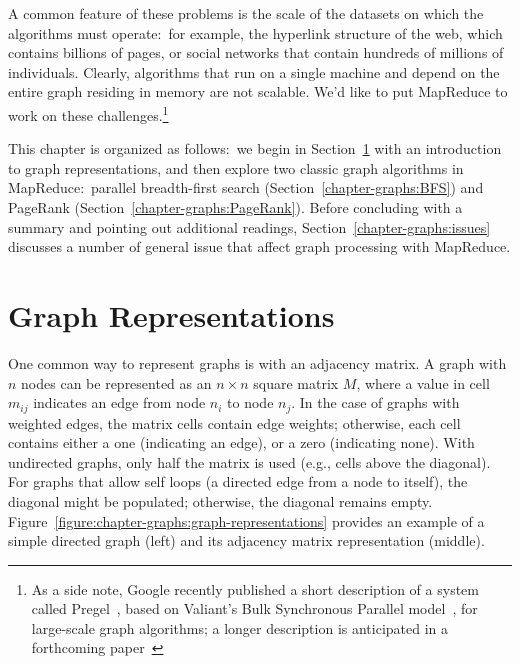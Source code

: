 \noindent A common feature of these problems is the scale of the
datasets on which the algorithms must operate:\ for example, the
hyperlink structure of the web, which contains billions of pages, or
social networks that contain hundreds of millions of individuals.
Clearly, algorithms that run on a single machine and depend on the
entire graph residing in memory are not scalable.  We'd like to put
MapReduce to work on these challenges.\footnote{As a side note, Google
  recently published a short description of a system called
  Pregel~\cite{Malewicz_etal_2009}, based on Valiant's Bulk
  Synchronous Parallel model~\cite{Valiant_CACM1990}, for large-scale
  graph algorithms; a longer description is anticipated in a
  forthcoming paper~\cite{Malewicz_etal_SIGMOD2010}}

This chapter is organized as follows:\ we begin in
Section~\ref{chapter-graphs:graph-representations} with an
introduction to graph representations, and then explore two classic
graph algorithms in MapReduce:\ parallel breadth-first search
(Section~\ref{chapter-graphs:BFS}) and PageRank
(Section~\ref{chapter-graphs:PageRank}).  Before concluding with a
summary and pointing out additional readings,
Section~\ref{chapter-graphs:issues} discusses a number of general
issue that affect graph processing with MapReduce.

\section{Graph Representations}
\label{chapter-graphs:graph-representations}

One common way to represent graphs is with an adjacency matrix.  A
graph with $n$ nodes can be represented as an $n \times n$ square
matrix $M$, where a value in cell $m_{ij}$ indicates an edge from node
$n_i$ to node $n_j$.  In the case of graphs with weighted edges, the
matrix cells contain edge weights; otherwise, each cell contains
either a one (indicating an edge), or a zero (indicating none).  With
undirected graphs, only half the matrix is used (e.g., cells above the
diagonal).  For graphs that allow self loops (a directed edge from a
node to itself), the diagonal might be populated; otherwise, the
diagonal remains empty.
Figure~\ref{figure:chapter-graphs:graph-representations} provides an example
of a simple directed graph (left) and its adjacency matrix
representation (middle).


